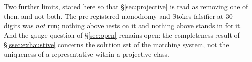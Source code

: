 Two further limits, stated here so that \S\ref{sec:projective} is read as
removing one of them and not both. The pre-registered monodromy-and-Stokes
falsifier at $30$ digits was \emph{not} run; nothing above rests on it and
nothing above stands in for it. And the gauge question of \S\ref{sec:open}
remains open: the completeness result of \S\ref{ssec:exhaustive} concerns the
solution set of the matching system, not the uniqueness of a representative
within a projective class.
